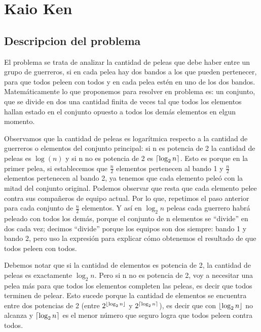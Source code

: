 \documentclass[10pt,a4paper]{article}
\DeclarePairedDelimiter\ceil{\lceil}{\rceil}
\DeclarePairedDelimiter\floor{\lfloor}{\rfloor}
\begin{document}

\section{Kaio Ken}

\subsection{Descripcion del problema}
\par{El problema se trata de analizar la cantidad de peleas que debe haber entre un grupo de
guerreros, si en cada pelea hay dos bandos a los que pueden pertenecer, para que todos
peleen con todos y en cada pelea estén en uno de los dos bandos. Matemáticamente lo que
proponemos para resolver en problema es: un conjunto, que se divide en dos una cantidad
finita de veces tal que todos los elementos hallan estado en el conjunto opuesto a todos
los demás elementos en elgun momento.}
\par{Observamos que la cantidad de peleas es logarítmica respecto a la cantidad de guerreros o elementos del conjunto principal: si n es potencia de 2 la cantidad de peleas es $\log(n)$ y si n no es potencia de 2 es $\ceil*{\log_2 n}$. Esto es porque en la primer pelea, si establecemos que $\frac{n}{2}$ elementos pertenecen al bando 1 y $\frac{n}{2}$ elementos pertenecen al bando 2, ya tenemos que cada elemento peleó con la mitad del conjunto original. Podemos observar que resta que cada elemento pelee contra sus compañeros de equipo actual. Por lo que, repetimos el paso anterior para cada conjunto de $\frac{n}{2}$ elementos. Y así en $\log_2 n$ peleas cada guerrero habrá peleado con todos los demás, porque el conjunto de n elementos se “divide” en dos cada vez; decimos “divide” porque los equipos son dos siempre: bando 1 y bando 2, pero uso la expresión para explicar cómo obtenemos el resultado de que todos peleen con todos.}
\par{Debemos notar que si la cantidad de elementos es potencia de 2, la cantidad de peleas es exactamente $\log_2 n$. Pero si n no es potencia de 2, voy a necesitar una pelea más para que todos los elementos completen las peleas, es decir que todos terminen de pelear. Esto sucede porque la cantidad de elementos se encuentra entre dos
potencias de 2 (entre $2^{\floor*{\log_2 n}}$ y $2^{\ceil*{\log_2 n}}$), es decir que con ${\floor*{\log_2 n}}$ no alcanza y ${\ceil*{\log_2 n}}$ es el menor número que seguro logra que todos peleen contra todos.}
\end{document}

